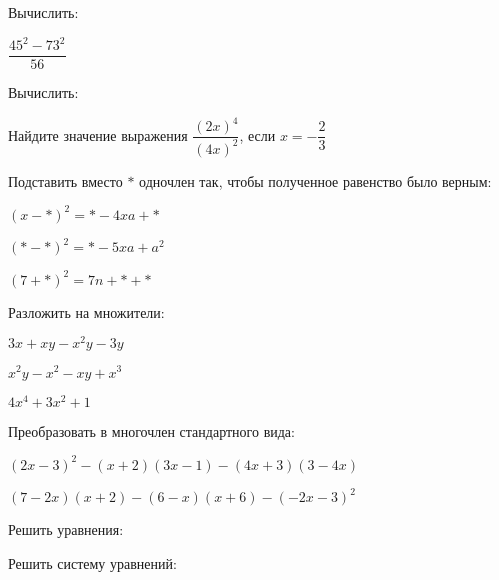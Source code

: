 \begin{listofex}
	\item Вычислить:
	\begin{enumcols}[itemcolumns=2]
		\item {}
		\item {}
		\item \( \dfrac{45^2-73^2}{56} \)
		\item {}
	\end{enumcols}
	\item Вычислить:
	\begin{enumcols}[itemcolumns=2]
		\item {}
		\item {}
	\end{enumcols}
	\item Найдите значение выражения \( \dfrac{(2x)^4}{(4x)^2} \), если \( x=-\dfrac{2}{3} \)
	\item Подставить вместо \( * \) одночлен так, чтобы полученное равенство было верным:
	\begin{enumcols}[itemcolumns=3]
		\item \( (x-*)^2=*-4xa+* \)
		\item \( (*-*)^2=*-5xa+a^2 \)
		\item \( (7+*)^2=7n+*+* \)
	\end{enumcols}
	\item Разложить на множители:
	\begin{enumcols}[itemcolumns=3]
		\item \( 3x+xy-x^2y-3y \)
		\item \( x^2y-x^2-xy+x^3 \)
		\item \( 4x^4+3x^2+1 \)
	\end{enumcols}
	\item Преобразовать в многочлен стандартного вида:
	\begin{enumcols}[itemcolumns=2]
		\item \( (2x-3)^2-(x+2)(3x-1)-(4x+3)(3-4x) \)
		\item \( (7-2x)(x+2)-(6-x)(x+6)-(-2x-3)^2 \)
	\end{enumcols}
	\item Решить уравнения:
	\begin{enumcols}[itemcolumns=3]
		\item {}
		\item {}
		\item {}
	\end{enumcols}
	\item Решить систему уравнений:
	\begin{enumcols}[itemcolumns=3]
		\item {}
		\item {}
		\item {}
	\end{enumcols}
\end{listofex}